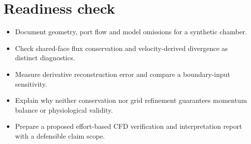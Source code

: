 \documentclass[11pt,letterpaper]{article}
\theoremstyle{definition}\newtheorem{definition}{Definition}\newtheorem{example}{Example}
\numberwithin{equation}{section}
\begin{document}
\section*{Readiness check}
\begin{itemize}
\item Document geometry, port flow and model omissions for a synthetic chamber.
\item Check shared-face flux conservation and velocity-derived divergence as distinct diagnostics.
\item Measure derivative reconstruction error and compare a boundary-input sensitivity.
\item Explain why neither conservation nor grid refinement guarantees momentum balance or physiological validity.
\item Prepare a proposed effort-based CFD verification and interpretation report with a defensible claim scope.
\end{itemize}
\end{document}

